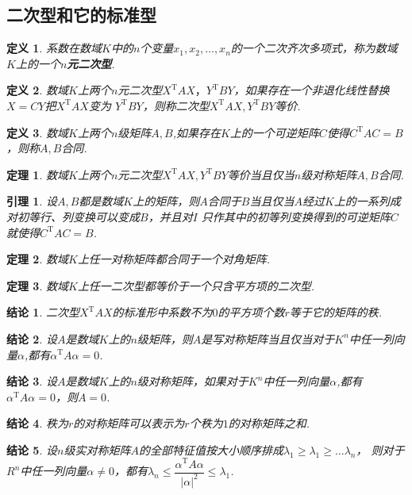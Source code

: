 \documentclass[UTF8]{article}
\newtheorem{thrm}{定理}[subsection]
\newtheorem{lemma}{引理}[subsection]
\newtheorem{defn}{定义}[subsection]
\newtheorem{ccl}{结论}[subsection]
\begin{document}
\subsection{二次型和它的标准型}
\begin{defn}
  系数在数域$K$中的$n$个变量$x_1,x_2,\ldots,x_n$的一个二次齐次多项式，称为数域$K$上的一个\textbf{$n$元二次型}.
\end{defn}
\begin{defn}
  数域$K$上两个$n$元二次型$X^{\mathrm{T}}AX，Y^{\mathrm{T}}BY$，如果存在一个非退化线性替换$X=CY$把$X^{\mathrm{T}}AX$变为
  $Y^{\mathrm{T}}BY$，则称二次型$X^{\mathrm{T}}AX,Y^{\mathrm{T}}BY$等价.
\end{defn}
\begin{defn}
  数域$K$上两个$n$级矩阵$A,B$,如果存在$K$上的一个可逆矩阵$C$使得$C^{\mathrm{T}}AC=B$，则称$A,B$合同.
\end{defn}
\begin{thrm}
  数域$K$上两个$n$元二次型$X^{\mathrm{T}}AX,Y^{\mathrm{T}}BY$等价当且仅当$n$级对称矩阵$A,B$合同.
\end{thrm}
\begin{lemma}
  设$A,B$都是数域$K$上的矩阵，则$A$合同于$B$当且仅当$A$经过$K$上的一系列成对初等行、列变换可以变成$B$，并且对$I$
  只作其中的初等列变换得到的可逆矩阵$C$就使得$C^{\mathrm{T}}AC=B$.
\end{lemma}
\begin{thrm}
  数域$K$上任一对称矩阵都合同于一个对角矩阵.
\end{thrm}
\begin{thrm}
  数域$K$上任一二次型都等价于一个只含平方项的二次型.
\end{thrm}
\begin{ccl}
  二次型$X^{\mathrm{T}}AX$的标准形中系数不为$0$的平方项个数$r$等于它的矩阵的秩.
\end{ccl}
\begin{ccl}
  设$A$是数域$K$上的$n$级矩阵，则$A$是写对称矩阵当且仅当对于$K^n$中任一列向量$\alpha$,都有$\alpha^{\mathrm{T}}A\alpha=0$.
\end{ccl}
\begin{ccl}
  设$A$是数域$K$上的$n$级对称矩阵，如果对于$K^n$中任一列向量$\alpha$,都有$\alpha^{\mathrm{T}}A\alpha=0$，则$A=0$.
\end{ccl}
\begin{ccl}
  秩为$r$的对称矩阵可以表示为$r$个秩为$1$的对称矩阵之和.
\end{ccl}
\begin{ccl}
  设$n$级实对称矩阵$A$的全部特征值按大小顺序排成$\lambda_1\ge \lambda_1 \ge \ldots \lambda_n$，
  则对于$R^n$中任一列向量$\alpha \ne 0$，都有$\lambda_n \le \dfrac{\alpha^{\mathrm{T}}A\alpha}{|\alpha|^2}\le \lambda_1$.
\end{ccl}
\end{document}
